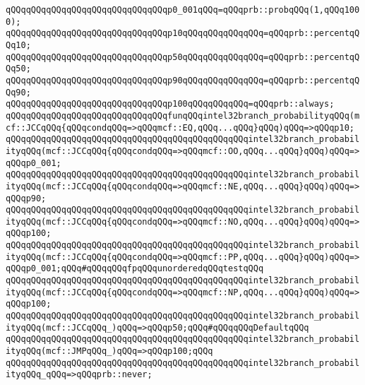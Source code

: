 \newline
\verb|qQQqqQQqqQQqqQQqqQQqqQQqqQQqqQQqp0_001qQQq=qQQqprb::probqQQq(1,qQQq1000);|\newline
\verb|qQQqqQQqqQQqqQQqqQQqqQQqqQQqqQQqp10qQQqqQQqqQQqqQQq=qQQqprb::percentqQQq10;|\newline
\verb|qQQqqQQqqQQqqQQqqQQqqQQqqQQqqQQqp50qQQqqQQqqQQqqQQq=qQQqprb::percentqQQq50;|\newline
\verb|qQQqqQQqqQQqqQQqqQQqqQQqqQQqqQQqp90qQQqqQQqqQQqqQQq=qQQqprb::percentqQQq90;|\newline
\verb|qQQqqQQqqQQqqQQqqQQqqQQqqQQqqQQqp100qQQqqQQqqQQq=qQQqprb::always;|\newline
\newline
\verb|qQQqqQQqqQQqqQQqqQQqqQQqqQQqqQQqfunqQQqintel32branch_probabilityqQQq(mcf::JCCqQQq{qQQqcondqQQq=>qQQqmcf::EQ,qQQq...qQQq}qQQq)qQQq=>qQQqp10;|\newline
\verb|qQQqqQQqqQQqqQQqqQQqqQQqqQQqqQQqqQQqqQQqqQQqqQQqintel32branch_probabilityqQQq(mcf::JCCqQQq{qQQqcondqQQq=>qQQqmcf::OO,qQQq...qQQq}qQQq)qQQq=>qQQqp0_001;|\newline
\verb|qQQqqQQqqQQqqQQqqQQqqQQqqQQqqQQqqQQqqQQqqQQqqQQqintel32branch_probabilityqQQq(mcf::JCCqQQq{qQQqcondqQQq=>qQQqmcf::NE,qQQq...qQQq}qQQq)qQQq=>qQQqp90;|\newline
\verb|qQQqqQQqqQQqqQQqqQQqqQQqqQQqqQQqqQQqqQQqqQQqqQQqintel32branch_probabilityqQQq(mcf::JCCqQQq{qQQqcondqQQq=>qQQqmcf::NO,qQQq...qQQq}qQQq)qQQq=>qQQqp100;|\newline
\verb|qQQqqQQqqQQqqQQqqQQqqQQqqQQqqQQqqQQqqQQqqQQqqQQqintel32branch_probabilityqQQq(mcf::JCCqQQq{qQQqcondqQQq=>qQQqmcf::PP,qQQq...qQQq}qQQq)qQQq=>qQQqp0_001;qQQq#qQQqqQQqfpqQQqunorderedqQQqtestqQQq|\newline
\verb|qQQqqQQqqQQqqQQqqQQqqQQqqQQqqQQqqQQqqQQqqQQqqQQqintel32branch_probabilityqQQq(mcf::JCCqQQq{qQQqcondqQQq=>qQQqmcf::NP,qQQq...qQQq}qQQq)qQQq=>qQQqp100;|\newline
\newline
\verb|qQQqqQQqqQQqqQQqqQQqqQQqqQQqqQQqqQQqqQQqqQQqqQQqintel32branch_probabilityqQQq(mcf::JCCqQQq_)qQQq=>qQQqp50;qQQq#qQQqqQQqDefaultqQQq|\newline
\verb|qQQqqQQqqQQqqQQqqQQqqQQqqQQqqQQqqQQqqQQqqQQqqQQqintel32branch_probabilityqQQq(mcf::JMPqQQq_)qQQq=>qQQqp100;qQQq|\newline
\newline
\verb|qQQqqQQqqQQqqQQqqQQqqQQqqQQqqQQqqQQqqQQqqQQqqQQqintel32branch_probabilityqQQq_qQQq=>qQQqprb::never;|\newline
